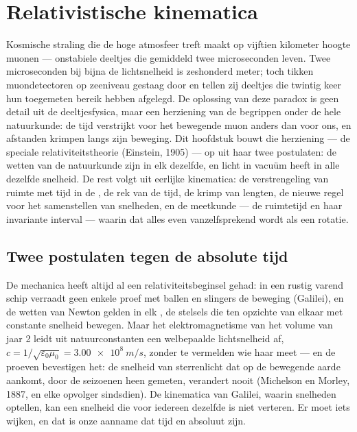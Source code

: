 \chapter{Relativistische kinematica}\label{ch:b3:relativistic-kinematics}

Kosmische straling die de hoge atmosfeer treft maakt op vijftien
kilometer hoogte muonen --- onstabiele deeltjes die gemiddeld twee
microseconden leven. Twee microseconden bij bijna de lichtsnelheid is
zeshonderd meter; toch tikken muondetectoren op zeeniveau gestaag door en
tellen zij deeltjes die twintig keer hun toegemeten bereik hebben
afgelegd. De oplossing van deze paradox is geen detail uit de
deeltjesfysica, maar een herziening van de begrippen onder de hele
natuurkunde: de tijd verstrijkt voor het bewegende muon anders dan voor
ons, en afstanden krimpen langs zijn beweging. Dit hoofdstuk bouwt die
herziening --- de speciale relativiteitstheorie (Einstein, 1905) --- op
uit haar twee postulaten: de wetten van de natuurkunde zijn in elk
 dezelfde, en licht in vacuüm heeft in alle
 dezelfde snelheid. De rest volgt uit eerlijke
kinematica: de verstrengeling van ruimte met tijd in de
, de rek van de tijd, de krimp van lengten, de nieuwe
regel voor het samenstellen van snelheden, en de meetkunde --- de
ruimtetijd en haar invariante interval --- waarin dat alles even
vanzelfsprekend wordt als een rotatie.

\section{Twee postulaten tegen de absolute tijd}

\begin{remark}\label{rem:b3:relativistic-kinematics:conflict}
De mechanica heeft altijd al een relativiteitsbeginsel gehad: in een
rustig varend schip verraadt geen enkele proef met ballen en slingers de
beweging (Galilei), en de wetten van Newton gelden in elk
\emph{}, de stelsels die ten opzichte van elkaar met
constante snelheid bewegen. Maar het elektromagnetisme van het volume van
jaar 2 leidt uit natuurconstanten een welbepaalde lichtsnelheid af, $c = 1/\sqrt{\varepsilon_0\mu_0} =
\qty{3.00e8}{m/s}$, zonder te vermelden wie
haar meet --- en de proeven bevestigen het: de snelheid van sterrenlicht
dat op de bewegende aarde aankomt, door de seizoenen heen gemeten,
verandert nooit (Michelson en Morley, 1887, en elke opvolger sindsdien).
De kinematica van Galilei, waarin snelheden optellen, kan een snelheid
die voor iedereen dezelfde is niet verteren. Er moet iets wijken, en dat
is onze aanname dat tijd en  absoluut zijn.
\end{remark}

